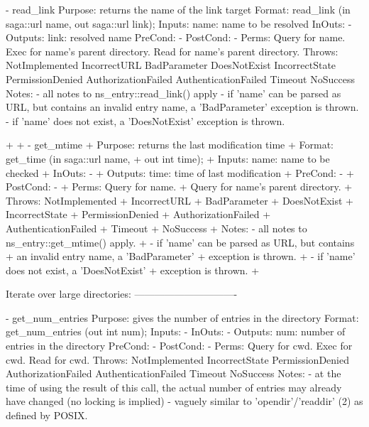 \begin{myspec}
 
    - read_link 
      Purpose:  returns the name of the link target
      Format:   read_link          (in  saga::url name,
                                    out saga::url link);
      Inputs:   name:               name to be resolved
      InOuts:   -
      Outputs:  link:               resolved name
      PreCond:  -
      PostCond: -
      Perms:    Query for name.
                Exec  for name's parent directory.
                Read  for name's parent directory.
      Throws:   NotImplemented
                IncorrectURL
                BadParameter
                DoesNotExist
                IncorrectState
                PermissionDenied
                AuthorizationFailed
                AuthenticationFailed
                Timeout
                NoSuccess
      Notes:    - all notes to ns_entry::read_link() apply
                - if 'name' can be parsed as URL, but contains 
                  an invalid entry name, a 'BadParameter'
                  exception is thrown.
                - if 'name' does not exist, a 'DoesNotExist'
                  exception is thrown.
 
+
+   - get_mtime
+     Purpose:  returns the last modification time
+     Format:   get_time           (in  saga::url name,
+                                   out int time);
+     Inputs:   name:               name to be checked
+     InOuts:   -
+     Outputs:  time:               time of last modification
+     PreCond:  -
+     PostCond: -
+     Perms:    Query for name.
+               Query for name's parent directory.
+     Throws:   NotImplemented
+               IncorrectURL
+               BadParameter
+               DoesNotExist
+               IncorrectState
+               PermissionDenied
+               AuthorizationFailed
+               AuthenticationFailed
+               Timeout
+               NoSuccess
+     Notes:    - all notes to ns_entry::get_mtime() apply.
+               - if 'name' can be parsed as URL, but contains 
+                 an invalid entry name, a 'BadParameter'
+                 exception is thrown.
+               - if 'name' does not exist, a 'DoesNotExist'
+                 exception is thrown.
+
 
 
    Iterate over large directories:
    -------------------------------
 
    - get_num_entries
      Purpose:  gives the number of entries in the directory
      Format:   get_num_entries    (out int   num);
      Inputs:   -
      InOuts:   -
      Outputs:  num:                number of entries in the
                                    directory
      PreCond:  -
      PostCond: -
      Perms:    Query for cwd.
                Exec  for cwd.
                Read  for cwd.
      Throws:   NotImplemented
                IncorrectState
                PermissionDenied
                AuthorizationFailed
                AuthenticationFailed
                Timeout
                NoSuccess
      Notes:    - at the time of using the result of this call,
                  the actual number of entries may already have
                  changed (no locking is implied)
                - vaguely similar to 'opendir'/'readdir' (2) as
                  defined by POSIX.
 

\end{myspec}
